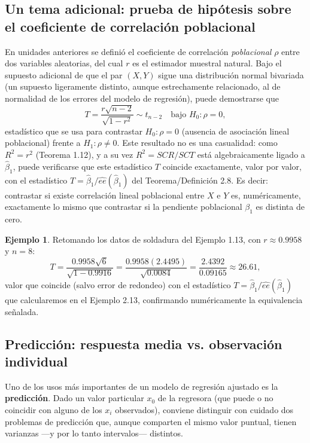 \documentclass[11pt,a4paper]{article}
\theoremstyle{plain}
\theoremstyle{definition}
\newtheorem{ejemplo}[teorema]{Ejemplo}
\theoremstyle{remark}
\begin{document}
\subsection{Un tema adicional: prueba de hipótesis sobre el coeficiente de correlación poblacional}

En unidades anteriores se definió el coeficiente de correlación \emph{poblacional} $\rho$ entre dos variables aleatorias, del cual $r$ es el estimador muestral natural. Bajo el supuesto adicional de que el par $(X,Y)$ sigue una distribución normal bivariada (un supuesto ligeramente distinto, aunque estrechamente relacionado, al de normalidad de los errores del modelo de regresión), puede demostrarse que
\[
T = \frac{r\sqrt{n-2}}{\sqrt{1-r^2}} \sim t_{n-2} \quad \text{bajo } H_0: \rho=0,
\]
estadístico que se usa para contrastar $H_0:\rho=0$ (ausencia de asociación lineal poblacional) frente a $H_1:\rho\neq0$. Este resultado no es una casualidad: como $R^2=r^2$ (Teorema 1.12), y a su vez $R^2=SCR/SCT$ está algebraicamente ligado a $\hat\beta_1$, puede verificarse que este estadístico $T$ coincide exactamente, valor por valor, con el estadístico $T=\hat\beta_1/\widehat{ee}(\hat\beta_1)$ del Teorema/Definición 2.8. Es decir: contrastar si existe correlación lineal poblacional entre $X$ e $Y$ es, numéricamente, exactamente lo mismo que contrastar si la pendiente poblacional $\beta_1$ es distinta de cero.

\begin{ejemplo}
Retomando los datos de soldadura del Ejemplo 1.13, con $r\approx0.9958$ y $n=8$:
\[
T = \frac{0.9958\sqrt{6}}{\sqrt{1-0.9916}} = \frac{0.9958(2.4495)}{\sqrt{0.0084}} = \frac{2.4392}{0.09165} \approx 26.61,
\]
valor que coincide (salvo error de redondeo) con el estadístico $T=\hat\beta_1/\widehat{ee}(\hat\beta_1)$ que calcularemos en el Ejemplo 2.13, confirmando numéricamente la equivalencia señalada.
\end{ejemplo}

\subsection{Predicción: respuesta media vs. observación individual}

Uno de los usos más importantes de un modelo de regresión ajustado es la \textbf{predicción}. Dado un valor particular $x_0$ de la regresora (que puede o no coincidir con alguno de los $x_i$ observados), conviene distinguir con cuidado dos problemas de predicción que, aunque comparten el mismo valor puntual, tienen varianzas —y por lo tanto intervalos— distintos.
\end{document}
